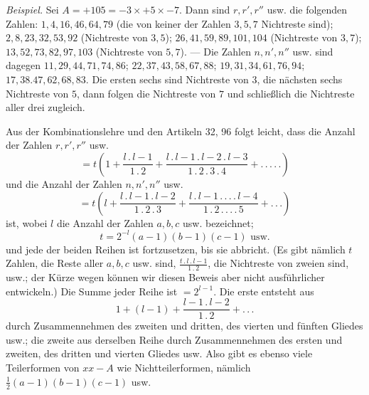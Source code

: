 \textit{Beispiel.} Sei $A=+105=-3\times+5\times-7$. Dann sind $r,r',r''$ usw. die folgenden Zahlen: $1,\allowbreak{}4,\allowbreak{}16,\allowbreak{}46,\allowbreak{}64,\allowbreak{}79$ (die von keiner der Zahlen $3,\allowbreak{}5,\allowbreak{}7$ Nichtreste sind); $2,\allowbreak{}8,\allowbreak{}23,\allowbreak{}32,\allowbreak{}53,\allowbreak{}92$ (Nichtreste von $3,\allowbreak{}5$); $26,\allowbreak{}41,\allowbreak{}59,\allowbreak{}89,\allowbreak{}101,\allowbreak{}104$ (Nichtreste von $3,\allowbreak{}7$); $13,\allowbreak{}52,\allowbreak{}73,\allowbreak{}82,\allowbreak{}97,\allowbreak{}103$ (Nichtreste von $5,\allowbreak{}7$). --- Die Zahlen $n,n',n''$ usw. sind dagegen $11,\allowbreak{}29,\allowbreak{}44,\allowbreak{}71,\allowbreak{}74,\allowbreak{}86$; $22,\allowbreak{}37,\allowbreak{}43,\allowbreak{}58,\allowbreak{}67,\allowbreak{}88$; $19,\allowbreak{}31,\allowbreak{}34,\allowbreak{}61,\allowbreak{}76,\allowbreak{}94$; $17,\allowbreak{}38.47,\allowbreak{}62,\allowbreak{}68,\allowbreak{}83$. Die ersten sechs sind Nichtreste von $3$, die nächsten sechs Nichtreste von $5$, dann folgen die Nichtreste von $7$ und schließlich die Nichtreste aller drei zugleich.

Aus der Kombinationslehre und den Artikeln 32, 96 folgt leicht, dass die Anzahl der Zahlen $r,r',r''$ usw.
\[
=t\left(1+\frac{l\, .\, l-1}{1\, .\, 2}+\frac{l\, .\, l-1\, .\, l-2\, .\, l-3}{1\, .\, 2\, .\, 3\, .\, 4}+ .\, .\, .\, .\, .\right)
\]
und die Anzahl der Zahlen $n,n',n''$ usw.
\[
=t\left(l+\frac{l\, .\, l-1\, .\, l-2}{1\, .\, 2\, .\, 3}+\frac{l\, .\, l-1\, .\, .\, .\, .\, l-4}{1\, .\, 2\, .\, .\, .\, .\, 5}+ .\, .\, .\right)
\]
ist, wobei $l$ die Anzahl der Zahlen $a,b,c$ usw. bezeichnet;
\[
t=2^{-l}(a-1)(b-1)(c-1)\text{ usw.}
\]
und jede der beiden Reihen ist fortzusetzen, bis sie abbricht. (Es gibt nämlich $t$ Zahlen, die Reste aller $a,b,c$ usw. sind, $\frac{t\, .\, l\, .\, l-1}{1\, .\, 2}$, die Nichtreste von zweien sind, usw.; der Kürze wegen können wir diesen Beweis aber nicht ausführlicher entwickeln.) Die Summe jeder Reihe ist $=2^{l-1}$. Die erste entsteht aus
\[
1+(l-1)+\frac{l-1\, .\, l-2}{1\, .\, 2}+ .\, .\, .
\]
durch Zusammennehmen des zweiten und dritten, des vierten und fünften Gliedes usw.; die zweite aus derselben Reihe durch Zusammennehmen des ersten und zweiten, des dritten und vierten Gliedes usw. Also gibt es ebenso viele Teilerformen von $xx-A$ wie Nichtteilerformen, nämlich $\frac{1}{2}(a-1)(b-1)(c-1)$ usw.

